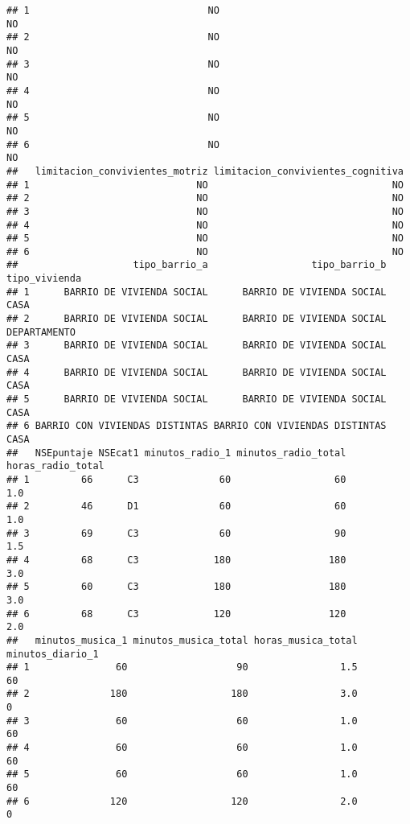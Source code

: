 \documentclass[
]{article}
\begin{document}
\begin{verbatim}
## 1                               NO                                  NO
## 2                               NO                                  NO
## 3                               NO                                  NO
## 4                               NO                                  NO
## 5                               NO                                  NO
## 6                               NO                                  NO
##   limitacion_convivientes_motriz limitacion_convivientes_cognitiva
## 1                             NO                                NO
## 2                             NO                                NO
## 3                             NO                                NO
## 4                             NO                                NO
## 5                             NO                                NO
## 6                             NO                                NO
##                    tipo_barrio_a                  tipo_barrio_b tipo_vivienda
## 1      BARRIO DE VIVIENDA SOCIAL      BARRIO DE VIVIENDA SOCIAL          CASA
## 2      BARRIO DE VIVIENDA SOCIAL      BARRIO DE VIVIENDA SOCIAL  DEPARTAMENTO
## 3      BARRIO DE VIVIENDA SOCIAL      BARRIO DE VIVIENDA SOCIAL          CASA
## 4      BARRIO DE VIVIENDA SOCIAL      BARRIO DE VIVIENDA SOCIAL          CASA
## 5      BARRIO DE VIVIENDA SOCIAL      BARRIO DE VIVIENDA SOCIAL          CASA
## 6 BARRIO CON VIVIENDAS DISTINTAS BARRIO CON VIVIENDAS DISTINTAS          CASA
##   NSEpuntaje NSEcat1 minutos_radio_1 minutos_radio_total horas_radio_total
## 1         66      C3              60                  60               1.0
## 2         46      D1              60                  60               1.0
## 3         69      C3              60                  90               1.5
## 4         68      C3             180                 180               3.0
## 5         60      C3             180                 180               3.0
## 6         68      C3             120                 120               2.0
##   minutos_musica_1 minutos_musica_total horas_musica_total minutos_diario_1
## 1               60                   90                1.5               60
## 2              180                  180                3.0                0
## 3               60                   60                1.0               60
## 4               60                   60                1.0               60
## 5               60                   60                1.0               60
## 6              120                  120                2.0                0

\end{verbatim}
\end{document}
